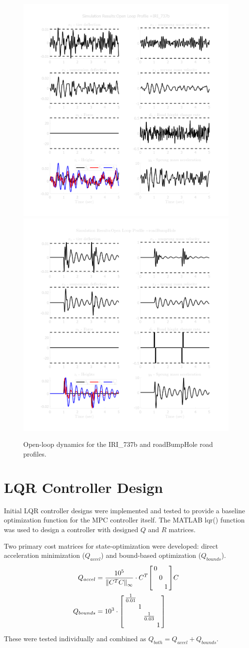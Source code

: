 \documentclass[]{IEEEtran}
\begin{document}
\begin{figure}[h]
    \centering
    \includegraphics[width = 0.49 \columnwidth]{figs/results_open_IRI_737b.png}
    \includegraphics[width = 0.49 \columnwidth]{figs/results_open_roadBumpHole.png}
    \caption{Open-loop dynamics for the IRI\_737b  and roadBumpHole road profiles.} \label{fig:open-loop}
\end{figure}


\section{LQR Controller Design}
Initial LQR controller designs were implemented and tested to provide a baseline optimization function for the MPC controller itself.
The MATLAB lqr() function was used to design a controller with designed $Q$ and $R$ matrices.

Two primary cost matrices for state-optimization were developed: direct acceleration minimization ($Q_{accel}$) and bound-based optimization ($Q_{bounds}$).
\begin{align}
    Q_{accel} &= \frac{10^5}{\norm{C^T C}_\infty} \cdot C^T \smqty[\dmat{0,0,1}] C
    \\
    Q_{bounds} &= 10^3 \cdot \smqty[\dmat{\frac{1}{0.01},1,\frac{1}{0.03},1}]
\end{align}
These were tested individually and combined as $Q_{both} = Q_{accel} + Q_{bounds}$.
\end{document}
